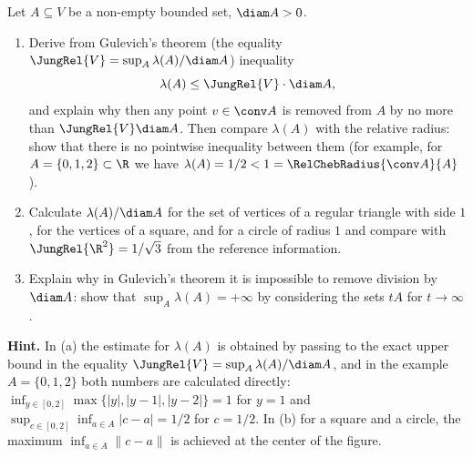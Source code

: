 \documentclass[a4paper,12pt]{report}
\begin{document}
\begin{task}
Let $A \subseteq V$ be a non-empty bounded set, $\diam A > 0$.

\begin{enumerate}[label=\textup{(\alph*)}]
\item Derive from Gulevich's theorem \textup{(}the equality $\JungRel{V} = \sup_A \lambda(A)/\diam A$\textup{)} inequality
\[
\lambda(A) \le \JungRel{V} \cdot \diam A,
\]
and explain why then any point $v \in \conv A$ is removed from $A$ by no more than $\JungRel{V} \diam A$. Then compare $\lambda(A)$ with the relative radius\textup{:} show that there is no pointwise inequality between them \textup{(}for example, for $A = \{0, 1, 2\} \subset \R$ we have $\lambda(A) = 1/2 < 1 = \RelChebRadius{\conv A}{A}$\textup{)}.
\item Calculate $\lambda(A)/\diam A$ for the set of vertices of a regular triangle with side $1$, for the vertices of a square, and for a circle of radius $1$ and compare with $\JungRel{\R^2} = 1/\sqrt3$ from the reference information.
\item Explain why in Gulevich's theorem it is impossible to remove division by $\diam A$\textup{:} show that $\sup_A \lambda(A) = +\infty$ by considering the sets $tA$ for $t \to \infty$.
\end{enumerate}

\textbf{Hint.} In \textup{(a)} the estimate for $\lambda(A)$ is obtained by passing to the exact upper bound in the equality $\JungRel{V} = \sup_A \lambda(A)/\diam A$, and in the example $A = \{0,1,2\}$ both numbers are calculated directly\textup{:} $\inf_{y \in [0,2]} \max\{|y|, |y-1|, |y-2|\} = 1$ for $y = 1$ and $\sup_{c \in [0,2]} \inf_{a \in A} |c - a| = 1/2$ for $c = 1/2$. In \textup{(b)} for a square and a circle, the maximum $\inf_{a \in A} \|c - a\|$ is achieved at the center of the figure.
\end{task}
\end{document}
